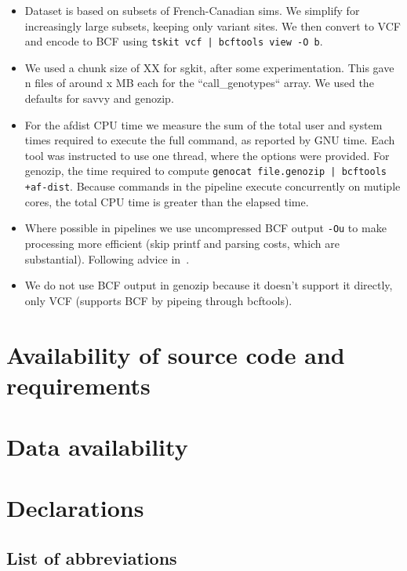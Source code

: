 \documentclass[a4paper,num-refs]{oup-contemporary}
\begin{document}
\begin{itemize}
\item Dataset is based on subsets of French-Canadian sims. We simplify
for increasingly large subsets, keeping only variant sites. We then
convert to VCF and encode to BCF using
\texttt{tskit vcf | bcftools view -O b}.
\item We used a chunk size of XX for sgkit, after some experimentation.
This gave n files of around x MB each for the ``call\_genotypes`` array.
We used the defaults for savvy and genozip.
\item For the afdist CPU time we measure the sum of the total user and
system times required to execute the full command, as reported by GNU
time. Each tool was instructed to use one thread, where the options
were provided. For genozip, the time required to compute
\texttt{genocat file.genozip | bcftools +af-dist}. Because commands
in the pipeline execute concurrently on mutiple cores, the total CPU time is
greater than the elapsed time.
\item Where possible in pipelines we use uncompressed BCF
 output \texttt{-Ou} to make processing more efficient (skip printf
and parsing costs, which are substantial). Following advice
in~\citep{danecek2021twelve}.
\item We do not use BCF output in genozip because it doesn't support
it directly, only VCF (supports BCF by pipeing through bcftools).
\end{itemize}

\section{Availability of source code and requirements}

\section{Data availability}

\section{Declarations}

\subsection{List of abbreviations}
\end{document}
